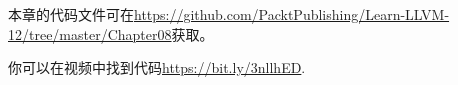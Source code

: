 本章的代码文件可在\url{https://github.com/PacktPublishing/Learn-LLVM-12/tree/master/Chapter08}获取。\par

你可以在视频中找到代码\url{https://bit.ly/3nllhED}.\par